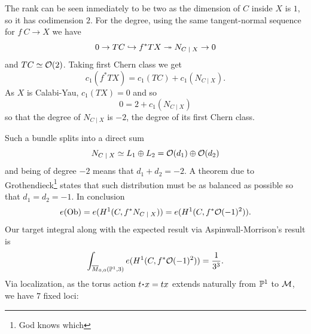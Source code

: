 \documentclass[12pt]{memoir}
\begin{document}
\begin{ptcbp}
    The rank can be seen inmediately to be two as the dimension of $C$ inside $X$ is $1$, so it has codimension $2$. For the degree, using the same tangent-normal sequence for $f\: C\to X$ we have 
    $$0\to TC\hookto f^\ast TX\onto N_{C\mid X}\to 0$$
    and $TC\simeq\mathcal{O}(2)$. Taking first Chern class we get
    $$c_1(f^\ast TX)=c_1(TC)+c_1(N_{C\mid X}).$$
    As $X$ is Calabi-Yau, $c_1(TX)=0$ and so 
    $$0=2+c_1(N_{C\mid X})$$
    so that the degree of $N_{C\mid X}$ is $-2$, the degree of its first Chern class.
\end{ptcbp}

Such a bundle splits into a direct sum 
$$N_{C\mid X}\isom L_1\oplus L_2=\cO(d_1)\oplus\cO(d_2)$$
and being of degree $-2$ means that $d_1+d_2=-2$. A theorem due to Grothendieck\footnote{God knows which} states that such distribution must be as balanced as possible so that $d_1=d_2=-1$. In conclusion
$$e(\Ob)=e(H^1(C,f^\ast N_{C\mid X}))=e(H^1(C,f^\ast\cO(-1)^2)).$$
Our target integral along with the expected result via Aspinwall-Morrison's result is
$$\int_{\overline{M}_{0,0}(\mathbb{P}^1,3)}e(H^1(C,f^\ast\mathcal{O}(-1)^2))=\frac{1}{3^3}.$$
Via localization, as the torus action $t\.x=tx$ extends naturally from $\mathbb{P}^1$ to $\mathcal{M}$, we have $7$ fixed loci:

\ifx\nextra\undefined
\printindex
\else\fi
\nocite{*}


\end{document}
